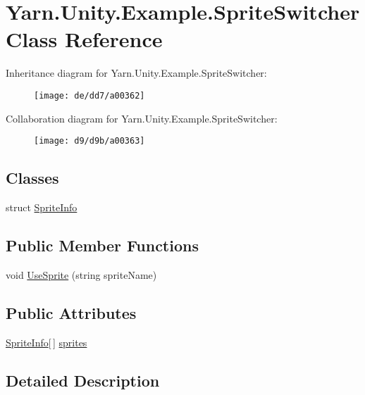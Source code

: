 \hypertarget{a00073}{\section{Yarn.\-Unity.\-Example.\-Sprite\-Switcher Class Reference}
\label{a00073}
}


Inheritance diagram for Yarn.\-Unity.\-Example.\-Sprite\-Switcher\-:
\nopagebreak
\begin{figure}[H]
\begin{center}
\leavevmode
\texttt{[image: de/dd7/a00362]}
\end{center}
\end{figure}


Collaboration diagram for Yarn.\-Unity.\-Example.\-Sprite\-Switcher\-:
\nopagebreak
\begin{figure}[H]
\begin{center}
\leavevmode
\texttt{[image: d9/d9b/a00363]}
\end{center}
\end{figure}
\subsection*{Classes}
\begin{DoxyCompactItemize}
\item 
struct \hyperlink{a00073_d0/d48/a00165}{Sprite\-Info}
\end{DoxyCompactItemize}
\subsection*{Public Member Functions}
\begin{DoxyCompactItemize}
\item 
void \hyperlink{a00073_ac26718b713f342f3de8f3e569c5b62da}{Use\-Sprite} (string sprite\-Name)
\end{DoxyCompactItemize}
\subsection*{Public Attributes}
\begin{DoxyCompactItemize}
\item 
\hyperlink{a00073_d0/d48/a00165}{Sprite\-Info}\mbox{[}$\,$\mbox{]} \hyperlink{a00073_a1e85d9f4f6b33ca7ae638cce2eb704aa}{sprites}
\end{DoxyCompactItemize}


\subsection{Detailed Description}


